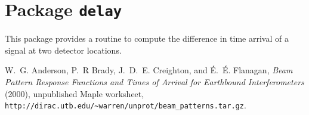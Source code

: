 \chapter{Package \texttt{delay}}

This package provides a routine to compute the difference in time arrival
of a signal at two detector locations.

\newpage

\newpage\begin{thebibliography}{1}
  
    W.~G. Anderson, P.~R Brady, J.~D.~E. Creighton, and \'E.~\'E. Flanagan,
    \emph{Beam Pattern Response
        Functions and Times of Arrival for Earthbound Interferometers}
    (2000), unpublished Maple worksheet,
    \verb+http://dirac.utb.edu/~warren/unprot/beam_patterns.tar.gz+.

\end{thebibliography}

